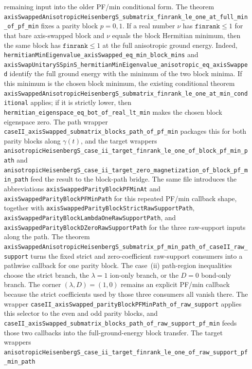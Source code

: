 \documentclass[a4paper,11pt]{article}
\begin{document}
remaining input into the older PF/min conditional form.  The theorem
\texttt{axisSwappedAnisotropicHeisenbergS\_submatrix\_finrank\_le\_one\_at\_full\_min\_of\_pf\_min}
fixes a parity block \(p=0,1\).  If a real number \(\nu\) has
\(\texttt{finrank}\le1\) for that bare axis-swapped block and
\(\nu\) equals the block Hermitian minimum, then the same block has
\(\texttt{finrank}\le1\) at the full anisotropic ground energy.  Indeed,
\texttt{hermitianMinEigenvalue\_axisSwapped\_eq\_min\_block\_mins}
and
\texttt{axisSwapUnitarySSpinS\_hermitianMinEigenvalue\_anisotropic\_eq\_axisSwapped}
identify the full ground energy with the minimum of the two block minima.  If
this minimum is the chosen block minimum, the existing conditional theorem
\texttt{axisSwappedAnisotropicHeisenbergS\_submatrix\_finrank\_le\_one\_at\_min\_conditional}
applies; if it is strictly lower, then
\texttt{hermitian\_eigenspace\_eq\_bot\_of\_real\_lt\_min} makes the chosen
block eigenspace zero.  The path wrapper
\texttt{caseII\_axisSwapped\_submatrix\_blocks\_path\_of\_pf\_min} packages
this for both parity blocks along \(\gamma(t)\), and the target wrappers
\texttt{anisotropicHeisenbergS\_case\_ii\_target\_finrank\_le\_one\_of\_block\_pf\_min\_path}
and
\texttt{anisotropicHeisenbergS\_case\_ii\_target\_zero\_magnetization\_of\_block\_pf\_min\_path}
feed the result to the block-path bridge.  The same file introduces the
abbreviations \texttt{axisSwappedParityBlockPFMinAt} and
\texttt{axisSwappedParityBlockPFMinPath} for this repeated PF/min callback
shape, together with
\texttt{axisSwappedParityBlockStrictRawSupportPath},
\texttt{axisSwappedParityBlockLambdaOneRawSupportPath}, and
\texttt{axisSwappedParityBlockDZeroRawSupportPath} for the three
raw-support inputs along the path.  The theorem
\texttt{axisSwappedAnisotropicHeisenbergS\_submatrix\_pf\_min\_path\_of\_caseII\_raw\_support}
turns the fixed strict and zero-coefficient raw-support consumers into a
pathwise callback for one parity block.  The case~(ii) path-region inequalities
choose the strict branch, the \(\lambda=1\) ion-only branch, or the \(D=0\)
bond-only branch.  The corner \((\lambda,D)=(1,0)\) remains an explicit
PF/min callback because the strict coefficients used by those three consumers
all vanish there.  The wrapper
\texttt{caseII\_axisSwapped\_parityBlockPFMinPath\_of\_raw\_support} applies
this selector to the even and odd parity blocks, and
\texttt{caseII\_axisSwapped\_submatrix\_blocks\_path\_of\_raw\_support\_pf\_min}
feeds those two callbacks into the full-ground-energy block transfer.  The
target wrappers
\texttt{anisotropicHeisenbergS\_case\_ii\_target\_finrank\_le\_one\_of\_raw\_support\_pf\_min\_path}
\end{document}
